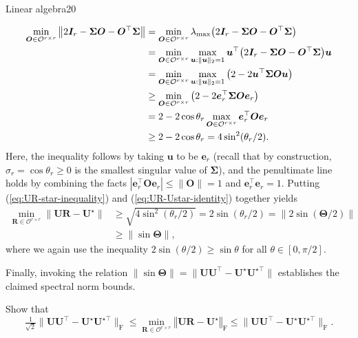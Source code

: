 \documentclass{article}
\begin{document}
\begin{problem}{Linear algebra}{20}
{%
\begin{align}
\min_{\bm{O}\in\mathcal{O}^{r\times r}}\big\|2\bm{I}_{r}-\bm{\Sigma}\bm{O}-\bm{O}^{\top}\bm{\Sigma}\big\|
	& = \min_{\bm{O}\in\mathcal{O}^{r\times r}}\lambda_{\max} \big( 2\bm{I}_{r}-\bm{\Sigma}\bm{O}-\bm{O}^{\top}\bm{\Sigma}\big) \notag\\
	& =\min_{\bm{O}\in\mathcal{O}^{r\times r}}\max_{\bm{u}:\|\bm{u}\|_{2}=1}\bm{u}^{\top}\big(2\bm{I}_{r}-\bm{\Sigma}\bm{O}-\bm{O}^{\top}\bm{\Sigma}\big)\bm{u}\nonumber \\
 & =\min_{\bm{O}\in\mathcal{O}^{r\times r}}\max_{\bm{u}:\|\bm{u}\|_{2}=1}\big(2-2\bm{u}^{\top}\bm{\Sigma}\bm{O}\bm{u}\big)\nonumber \\
 & \geq\min_{\bm{O}\in\mathcal{O}^{r\times r}}\big(2-2\bm{e}_{r}^{\top}\bm{\Sigma}\bm{O}\bm{e}_{r}\big)\nonumber \\
 & = 2-2\cos\theta_{r}\max_{\bm{O}\in\mathcal{O}^{r\times r}}\bm{e}_{r}^{\top}\bm{O}\bm{e}_{r}\nonumber \\
 & \geq 2-2\cos\theta_{r}
	=4\sin^{2}(\theta_{r}/2).\label{eq:UR-star-inequality}
\end{align}
%
Here, the inequality follows by taking $\bm{u}$ to be $\bm{e}_{r}$
(recall that by construction, $\sigma_{r}=\cos\theta_{r}\geq 0$ is the
smallest singular value of $\bm{\Sigma}$), and the penultimate line
holds by combining the facts $|\bm{e}_{r}^{\top}\bm{O}\bm{e}_{r}|\leq\|\bm{O}\|=1$
and $\bm{e}_{r}^{\top}\bm{e}_{r}=1$. Putting (\ref{eq:UR-star-inequality})
and (\ref{eq:UR-Ustar-identity}) together yields
%
\begin{align*}
\min_{\bm{R}\in\mathcal{O}^{r\times r}}\big\|\bm{U}\bm{R}-\bm{U}^{\star}\big\| & \geq\sqrt{4\sin^{2}(\theta_{r}/2)}=2\sin(\theta_{r}/2)=\|2\sin(\bm{\Theta}/2)\|\nonumber \\
 & \geq\|\sin\bm{\Theta}\|,
\end{align*}
%
where we again use the inequality $2\sin(\theta/2) \geq \sin \theta$ for all $\theta\in [0,\pi/2]$.

Finally, invoking the relation $\|\sin\bm{\Theta}\|=  \|\bm{U}\bm{U}^{\top} - \bm{U}^{\star}\bm{U}^{\star\top}\|$ establishes the claimed spectral norm bounds.






}


 Show that 
\[
\tfrac{1}{\sqrt{2}} \|\bm{U}\bm{U}^{\top} - \bm{U}^{\star}\bm{U}^{\star\top} \|_{\mathrm{F}}
	\leq
	\min_{\bm{R}\in\mathcal{O}^{r\times r}}\left\Vert \bm{U}\bm{R}-\bm{U}^{\star}\right\Vert _{\mathrm{F}}
	\leq \|\bm{U}\bm{U}^{\top} - \bm{U}^{\star}\bm{U}^{\star\top} \|_{\mathrm{F}}.
\] 



\end{problem}
\end{document}
